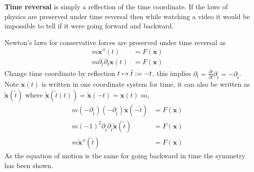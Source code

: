 \textbf{Time reversal} is simply a reflection of the time coordinate. If the laws of physics are preserved under time reversal then while watching a video it would be impossible to tell if it were going forward and backward.

Newton's laws for conservative forces are preserved under time reversal as
\begin{align*}
m \mathbf{x}''(t)&=F(\mathbf{x}) \\
m \partial_{t}\partial_{t}\mathbf{x}(t)&=F(\mathbf{x})
\end{align*}
Change time coordinate by reflection $t \mapsto \tilde{t}\vcentcolon=-t$, this implies $\partial_{t}=\frac{\partial \tilde{t}}{\partial t} \partial_{\tilde{t}}=-\partial_{\tilde{t}}$. Note $\mathbf{x}(t)$ is written in one coordinate system for time, it can also be written as $\mathbf{\tilde{x}}(\tilde{t})$ where $\mathbf{\tilde{x}}(\tilde{t}(t))=\mathbf{\tilde{x}}(-t)=\mathbf{x}(t)$ so,
\begin{align*}
m (-\partial_{\tilde{t}})(-\partial_{\tilde{t}})\mathbf{x}(-\tilde{t})&=F(\mathbf{x}) \\
m (-1)^2\partial_{\tilde{t}}\partial_{\tilde{t}}\mathbf{\tilde{x}}(\tilde{t})&=F(\mathbf{x}) \\
m \mathbf{\tilde{x}}''(\tilde{t})&=F(\mathbf{x})
\end{align*}
As the equation of motion is the same for going backward in time the symmetry has been shown.  

